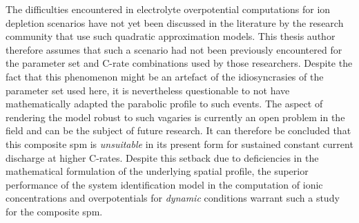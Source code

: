 The  difficulties  encountered  in electrolyte  overpotential  computations  for
ion  depletion scenarios  have  not  yet been  discussed  in  the literature  by
the  research  community that  use  such  quadratic approximation  models.  This
thesis author  therefore assumes that  such a  scenario had not  been previously
encountered  for  the  parameter  set  and C-rate  combinations  used  by  those
researchers. Despite the  fact that this phenomenon might be  an artefact of the
idiosyncrasies of the  parameter set used here, it  is nevertheless questionable
to not  have mathematically adapted  the parabolic  profile to such  events. The
aspect  of rendering  the model  robust to  such vagaries  is currently  an open
problem in the field and can be the subject of future research. It can therefore
be concluded that  this composite \gls{spm} is \emph{unsuitable}  in its present
form for  sustained constant current  discharge at higher C-rates.  Despite this
setback due  to deficiencies in  the mathematical formulation of  the underlying
spatial profile, the superior performance  of the system identification model in
the computation  of ionic  concentrations and overpotentials  for \emph{dynamic}
conditions warrant such a study for the composite \gls{spm}.

